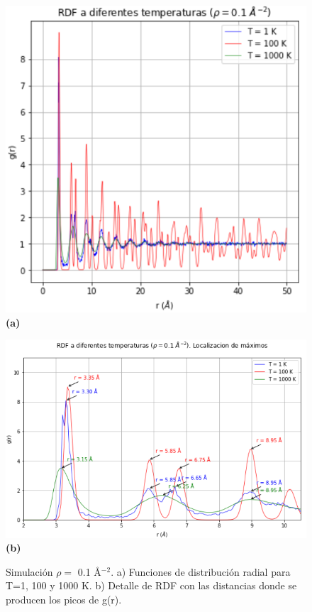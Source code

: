 \begin{figure}[H]
	\centering
	\begin{minipage}[b]{0.38\textwidth}
		\centering
		\includegraphics[width=1\textwidth]{grafico_3x17_0.1_rdf.png}
		\textbf{(a)}
	\end{minipage}%
	\begin{minipage}[b]{0.62\textwidth}
		\centering
		\includegraphics[width=1\textwidth]{grafico_3x16_0.1_rdf_detalle.png}
		\textbf{(b)}
	\end{minipage}
	\caption{\footnotesize Simulación  $\rho=$ 0.1 \AA$^{-2}$. a) Funciones de distribución radial para T=1, 100 y 1000 K. b) Detalle de RDF con las distancias donde se producen los picos de g(r).}
	\label{fig:rdf_0.1}
\end{figure}

